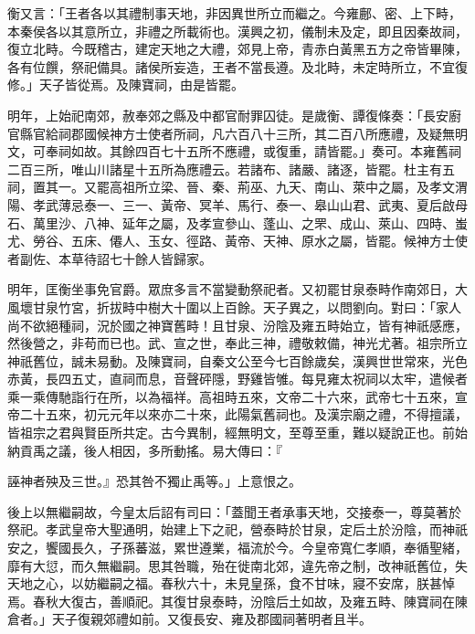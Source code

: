 \begin{pinyinscope}
衡又言：「王者各以其禮制事天地，非因異世所立而繼之。今雍鄜、密、上下畤，本秦侯各以其意所立，非禮之所載術也。漢興之初，儀制未及定，即且因秦故祠，復立北畤。今既稽古，建定天地之大禮，郊見上帝，青赤白黃黑五方之帝皆畢陳，各有位饌，祭祀備具。諸侯所妄造，王者不當長遵。及北畤，未定時所立，不宜復修。」天子皆從焉。及陳寶祠，由是皆罷。

明年，上始祀南郊，赦奉郊之縣及中都官耐罪囚徒。是歲衡、譚復條奏：「長安廚官縣官給祠郡國候神方士使者所祠，凡六百八十三所，其二百八所應禮，及疑無明文，可奉祠如故。其餘四百七十五所不應禮，或復重，請皆罷。」奏可。本雍舊祠二百三所，唯山川諸星十五所為應禮云。若諸布、諸嚴、諸逐，皆罷。杜主有五祠，置其一。又罷高祖所立梁、晉、秦、荊巫、九天、南山、萊中之屬，及孝文渭陽、孝武薄忌泰一、三一、黃帝、冥羊、馬行、泰一、皋山山君、武夷、夏后啟母石、萬里沙、八神、延年之屬，及孝宣參山、蓬山、之罘、成山、萊山、四時、蚩尤、勞谷、五床、僊人、玉女、徑路、黃帝、天神、原水之屬，皆罷。候神方士使者副佐、本草待詔七十餘人皆歸家。

明年，匡衡坐事免官爵。眾庶多言不當變動祭祀者。又初罷甘泉泰畤作南郊日，大風壞甘泉竹宮，折拔畤中樹大十圍以上百餘。天子異之，以問劉向。對曰：「家人尚不欲絕種祠，況於國之神寶舊畤！且甘泉、汾陰及雍五畤始立，皆有神祇感應，然後營之，非苟而已也。武、宣之世，奉此三神，禮敬敕備，神光尤著。祖宗所立神祇舊位，誠未易動。及陳寶祠，自秦文公至今七百餘歲矣，漢興世世常來，光色赤黃，長四五丈，直祠而息，音聲砰隱，野雞皆雊。每見雍太祝祠以太牢，遣候者乘一乘傳馳詣行在所，以為福祥。高祖時五來，文帝二十六來，武帝七十五來，宣帝二十五來，初元元年以來亦二十來，此陽氣舊祠也。及漢宗廟之禮，不得擅議，皆祖宗之君與賢臣所共定。古今異制，經無明文，至尊至重，難以疑說正也。前始納貢禹之議，後人相因，多所動搖。易大傳曰：『

誣神者殃及三世。』恐其咎不獨止禹等。」上意恨之。

後上以無繼嗣故，今皇太后詔有司曰：「蓋聞王者承事天地，交接泰一，尊莫著於祭祀。孝武皇帝大聖通明，始建上下之祀，營泰畤於甘泉，定后土於汾陰，而神祇安之，饗國長久，子孫蕃滋，累世遵業，福流於今。今皇帝寬仁孝順，奉循聖緒，靡有大愆，而久無繼嗣。思其咎職，殆在徙南北郊，違先帝之制，改神祇舊位，失天地之心，以妨繼嗣之福。春秋六十，未見皇孫，食不甘味，寢不安席，朕甚悼焉。春秋大復古，善順祀。其復甘泉泰畤，汾陰后土如故，及雍五畤、陳寶祠在陳倉者。」天子復親郊禮如前。又復長安、雍及郡國祠著明者且半。


\end{pinyinscope}

